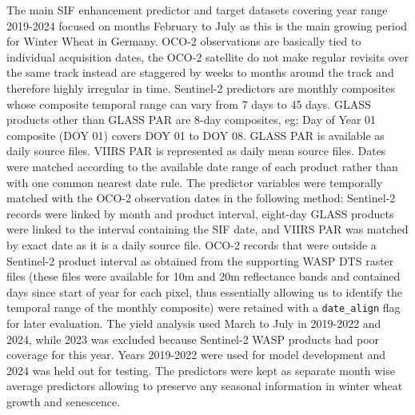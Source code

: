 The main SIF enhancement predictor and target datasets covering year range 2019-2024 focused on months February to July as this is the main growing period for Winter Wheat in Germany. OCO-2 observations are basically tied to individual acquisition dates, the OCO-2 satellite do not make regular revisits over the same track instead are staggered by weeks to months around the track and therefore highly irregular in time. Sentinel-2 predictors are monthly composites whose composite temporal range can vary from 7 days to 45 days. GLASS products other than GLASS PAR are 8-day composites, eg; Day of Year 01 composite (DOY 01) covers DOY 01 to DOY 08. GLASS PAR is available as daily source files. VIIRS PAR is represented as daily mean source files. Dates were matched according to the available date range of each product rather than with one common nearest date rule. The predictor variables were temporally matched with the OCO-2 observation dates in the following method: Sentinel-2 records were linked by month and product interval, eight-day GLASS products were linked to the interval containing the SIF date, and VIIRS PAR was matched by exact date as it is a daily source file. OCO-2 records that were outside a Sentinel-2 product interval as obtained from the supporting WASP DTS raster files (these files were available for 10m and 20m reflectance bands and contained days since start of year for each pixel, thus essentially allowing us to identify the temporal range of the monthly composite) were retained with a \texttt{date\_align} flag for later evaluation. The yield analysis used March to July in 2019-2022 and 2024, while 2023 was excluded because Sentinel-2 WASP products had poor coverage for this year.  Years 2019-2022 were used for model development and 2024 was held out for testing. The predictors were kept as separate month wise average predictors allowing to preserve any seasonal information in winter wheat growth and senescence.

